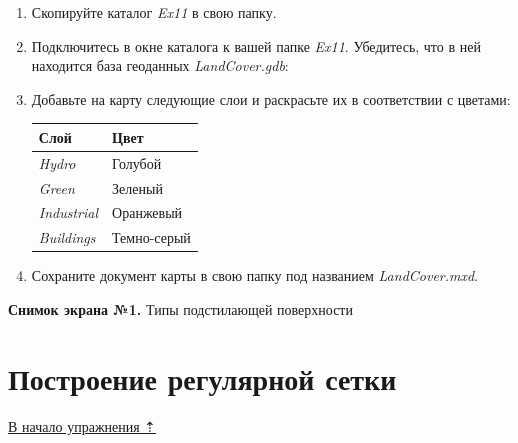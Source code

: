 \documentclass[]{book}
\theoremstyle{definition}
\theoremstyle{definition}
\theoremstyle{definition}
\theoremstyle{remark}
\begin{document}
\begin{enumerate}
\def\labelenumi{\arabic{enumi}.}
\item
  Скопируйте каталог \emph{Ex11} в свою папку.
\item
  Подключитесь в окне каталога к вашей папке \emph{Ex11}. Убедитесь, что
  в ней находится база геоданных \emph{LandCover.gdb}:
\item
  Добавьте на карту следующие слои и раскрасьте их в соответствии с
  цветами:

  \begin{longtable}[]{@{}ll@{}}
  \toprule
  Слой & Цвет\tabularnewline
  \midrule
  \endhead
  \emph{Hydro} & Голубой\tabularnewline
  \emph{Green} & Зеленый\tabularnewline
  \emph{Industrial} & Оранжевый\tabularnewline
  \emph{Buildings} & Темно-серый\tabularnewline
  \bottomrule
  \end{longtable}
\item
  Сохраните документ карты в свою папку под названием
  \emph{LandCover.mxd}.
\end{enumerate}

\textbf{Снимок экрана №1.} Типы подстилающей поверхности

\hypertarget{land-cover-hydro-fishnet}{%
\section{Построение регулярной сетки}\label{land-cover-hydro-fishnet}}

\protect\hyperlink{land-cover-hydro}{В начало упражнения ⇡}
\end{document}
